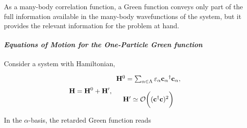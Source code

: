 \documentclass{homework}
\begin{document}
As a many-body correlation function, a Green function conveys only part of the full information available in the many-body wavefunctions of the system, but it provides the relevant information for the problem at hand. \\

\paragraph{\textit{Equations of Motion for the One-Particle Green function}}

Consider a system with Hamiltonian, 

\begin{equation}
    {{\bf H}} = {{\bf H}}^{0} + {{\bf H}}', \begin{array}{c}
         {{\bf H}}^{0} = \sum_{\alpha \in \Lambda} \varepsilon_{\alpha} {{\bf c}_{\alpha}}^\dagger {{\bf c}_{\alpha}}, \\  
         \\
         {\bf H}' \simeq \mathcal{O}\bigg(({{\bf c}}^\dagger {{\bf c}})^2\bigg) \\
    \end{array}
\end{equation}

In the $\alpha$-basis, the retarded Green function reads 
\end{document}
